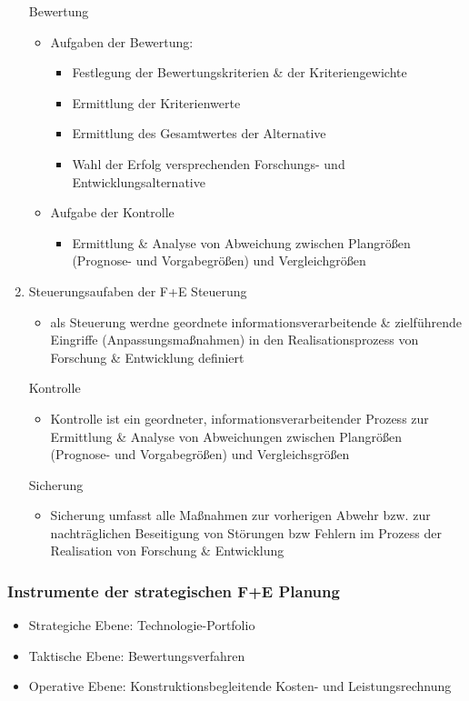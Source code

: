 \documentclass[11pt]{article}
\begin{document}
\begin{enumerate}
Bewertung
\begin{itemize}
\item Aufgaben der Bewertung:
\begin{itemize}
\item Festlegung der Bewertungskriterien \& der Kriteriengewichte
\item Ermittlung der Kriterienwerte
\item Ermittlung des Gesamtwertes der Alternative
\item Wahl der Erfolg versprechenden Forschungs- und Entwicklungsalternative
\end{itemize}
\item Aufgabe der Kontrolle
\begin{itemize}
\item Ermittlung \& Analyse von Abweichung zwischen Plangrößen (Prognose- und Vorgabegrößen) und Vergleichgrößen
\end{itemize}
\end{itemize}

\item Steuerungsaufaben der F+E
\label{sec:org418a9ab}
Steuerung
\begin{itemize}
\item als Steuerung werdne geordnete informationsverarbeitende \& zielführende Eingriffe (Anpassungsmaßnahmen) in den Realisationsprozess von Forschung \& Entwicklung definiert
\end{itemize}

Kontrolle
\begin{itemize}
\item Kontrolle ist ein geordneter, informationsverarbeitender Prozess zur Ermittlung \& Analyse von Abweichungen zwischen Plangrößen (Prognose- und Vorgabegrößen) und Vergleichsgrößen
\end{itemize}

Sicherung
\begin{itemize}
\item Sicherung umfasst alle Maßnahmen zur vorherigen Abwehr bzw. zur nachträglichen Beseitigung von Störungen bzw Fehlern im Prozess der Realisation von Forschung \& Entwicklung
\end{itemize}
\end{enumerate}
\subsubsection{Instrumente der strategischen F+E Planung}
\label{sec:org5e499d8}
\begin{itemize}
\item Strategiche Ebene: Technologie-Portfolio
\item Taktische Ebene: Bewertungsverfahren
\item Operative Ebene: Konstruktionsbegleitende Kosten- und Leistungsrechnung
\end{itemize}
\end{document}
